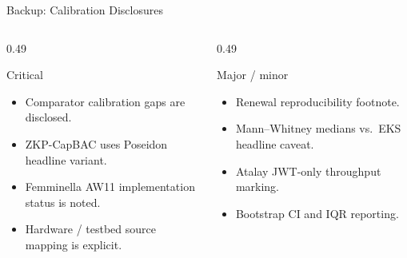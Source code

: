 \documentclass[aspectratio=169,11pt]{beamer}
\newcommand{\tightitems}{%
  \setlength{\topsep}{2pt}%
  \setlength{\itemsep}{4pt}%
  \setlength{\parsep}{0pt}%
}
\begin{document}
{%
\begin{frame}[noframenumbering]{Backup: Calibration Disclosures}
\vspace{2pt}
\begin{columns}[T,onlytextwidth]
\begin{column}{0.49\textwidth}
\begin{callout}{Critical}
\begin{itemize}\tightitems
\item Comparator calibration gaps are disclosed.
\item ZKP-CapBAC uses Poseidon headline variant.
\item Femminella AW11 implementation status is noted.
\item Hardware / testbed source mapping is explicit.
\end{itemize}
\end{callout}
\end{column}
\begin{column}{0.49\textwidth}
\begin{callout}{Major / minor}
\begin{itemize}\tightitems
\item Renewal reproducibility footnote.
\item Mann--Whitney medians vs.\ EKS headline caveat.
\item Atalay JWT-only throughput marking.
\item Bootstrap CI and IQR reporting.
\end{itemize}
\end{callout}
\end{column}
\end{columns}
\end{frame}

}
\end{document}
